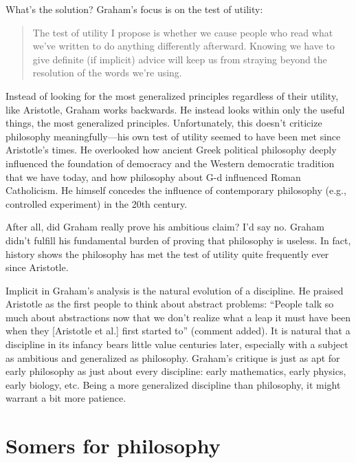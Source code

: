 \documentclass[12pt]{article}
\begin{document}
What's the solution? Graham's focus is on the test of utility:

\begin{quotation}
 The test of utility I propose is whether we cause people who read what we've written to do anything differently afterward. Knowing we have to give definite (if implicit) advice will keep us from straying beyond the resolution of the words we're using.
\end{quotation}

Instead of looking for the most generalized principles regardless of their utility, like Aristotle, Graham works backwards. He instead looks within only the useful things, the most generalized principles. Unfortunately, this doesn't criticize philosophy meaningfully---his own test of utility seemed to have been met since Aristotle's times. He overlooked how ancient Greek political philosophy deeply influenced the foundation of democracy and the Western democratic tradition that we have today, and how philosophy about G-d influenced Roman Catholicism. He himself concedes the influence of contemporary philosophy (e.g., controlled experiment) in the 20th century.

After all, did Graham really prove his ambitious claim? I'd say no. Graham didn't fulfill his fundamental burden of proving that philosophy is useless. In fact, history shows the philosophy has met the test of utility quite frequently ever since Aristotle.

Implicit in Graham's analysis is the natural evolution of a discipline. He praised Aristotle as the first people to think about abstract problems: \enquote{People talk so much about abstractions now that we don't realize what a leap it must have been when they [Aristotle et al.] first started to} (comment added). It is natural that a discipline in its infancy bears little value centuries later, especially with a subject as ambitious and generalized as philosophy. Graham's critique is just as apt for early philosophy as just about every discipline: early mathematics, early physics, early biology, etc. Being a more generalized discipline than philosophy, it might warrant a bit more patience.

\section{Somers for philosophy}
\end{document}
